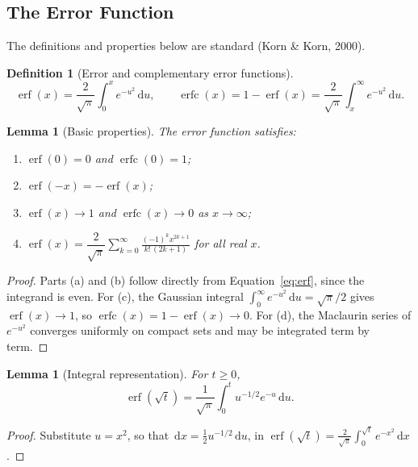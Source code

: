 \documentclass[12pt,a4paper]{article}
\theoremstyle{definition}
\newtheorem{definition}{Definition}[section]
\theoremstyle{plain}
\newtheorem{lemma}[theorem]{Lemma}
\theoremstyle{remark}
\newcommand{\erf}{\operatorname{erf}}
\newcommand{\erfc}{\operatorname{erfc}}
\newcommand{\dd}{\,\mathrm{d}}
\begin{document}
	\subsection{The Error Function}
	
	The definitions and properties below are standard (Korn \& Korn, 2000).
	
	\begin{definition}[Error and complementary error functions]\label{def:erf}
		\begin{equation}\label{eq:erf}
			\erf(x)=\frac{2}{\sqrt{\pi}}\int_0^x e^{-u^2}\dd u,\qquad
			\erfc(x)=1-\erf(x)=\frac{2}{\sqrt{\pi}}\int_x^\infty e^{-u^2}\dd u.
		\end{equation}
	\end{definition}
	
	\begin{lemma}[Basic properties]\label{lem:erfprops}
		The error function satisfies:
		\begin{enumerate}[label=(\alph*)]
			\item $\erf(0)=0$ and $\erfc(0)=1$;
			\item $\erf(-x)=-\erf(x)$;
			\item $\erf(x)\to 1$ and $\erfc(x)\to 0$ as $x\to\infty$;
			\item $\erf(x)=\dfrac{2}{\sqrt{\pi}}\displaystyle\sum_{k=0}^{\infty}\frac{(-1)^k x^{2k+1}}{k!\,(2k+1)}$ for all real $x$.
		\end{enumerate}
	\end{lemma}
	
	\begin{proof}
		Parts (a) and (b) follow directly from Equation~\eqref{eq:erf}, since the integrand is even. For (c), the Gaussian integral $\int_0^\infty e^{-u^2}\dd u=\sqrt{\pi}/2$ gives $\erf(x)\to 1$, so $\erfc(x)=1-\erf(x)\to 0$. For (d), the Maclaurin series of $e^{-u^2}$ converges uniformly on compact sets and may be integrated term by term.
	\end{proof}
	
	\begin{lemma}[Integral representation]\label{lem:rep}
		For $t\ge 0$,
		\begin{equation}\label{eq:rep}
			\erf(\sqrt{t})=\frac{1}{\sqrt{\pi}}\int_0^t u^{-1/2}e^{-u}\dd u .
		\end{equation}
	\end{lemma}
	
	\begin{proof}
		Substitute $u=x^2$, so that $\dd x=\tfrac{1}{2}u^{-1/2}\dd u$, in $\erf(\sqrt{t})=\tfrac{2}{\sqrt{\pi}}\int_0^{\sqrt{t}}e^{-x^2}\dd x$.
	\end{proof}
	
\end{document}
